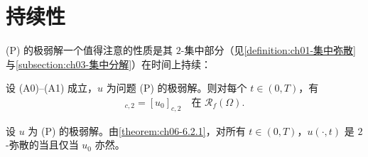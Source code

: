 \documentclass[../../main.tex]{subfiles}%
\begin{document}
\section{持续性}\label{section:ch06-持续性}

(P) 的极弱解一个值得注意的性质是其 $2$-集中部分（见\cref{definition:ch01-集中弥散}与\cref{subsection:ch03-集中分解}）在时间上持续：

\begin{theorem}\label{theorem:ch06-6.2.1}
设 (A0)--(A1) 成立，$u$ 为问题 (P) 的极弱解。则对每个 $t\in(0,T)$，有
\begin{align}
[u(\cdot,t)]_{c,2}=[u_0]_{c,2} \quad\text{在 }\mathscr{R}_f(\Omega). \label{align:ch6-6.12}
\end{align}
\end{theorem}

\begin{remark}\label{remark:ch06-6.2.1}
设 $u$ 为 (P) 的极弱解。由\cref{theorem:ch06-6.2.1}，对所有 $t\in(0,T)$，$u(\cdot,t)$ 是 $2$-弥散的当且仅当 $u_0$ 亦然。
\end{remark}
\end{document}
